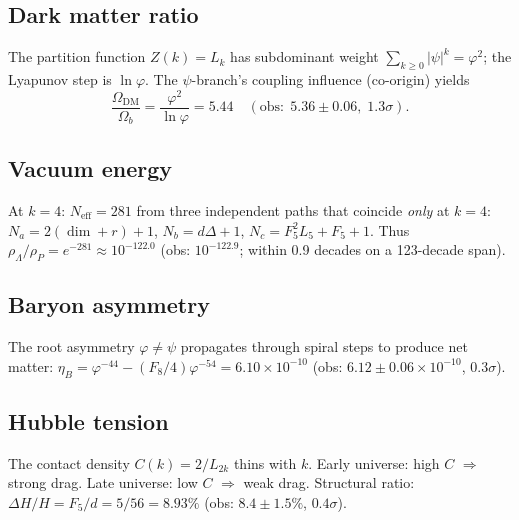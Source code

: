 \documentclass[12pt,a4paper]{article}
\begin{document}
\subsection{Dark matter ratio}
\label{sec:dm-ratio-kiss}
The partition function $Z(k)=L_k$ has subdominant weight $\sum_{k\ge 0}|\psi|^k = \varphi^2$; the Lyapunov step is $\ln\varphi$. The $\psi$-branch's coupling influence (co-origin) yields
\begin{equation}
\frac{\Omega_{\mathrm{DM}}}{\Omega_b} = \frac{\varphi^2}{\ln\varphi} = 5.44 \quad (\mathrm{obs:}\; 5.36 \pm 0.06,\; 1.3\sigma).
\end{equation}

\subsection{Vacuum energy}
At $k=4$: $N_{\mathrm{eff}} = 281$ from three independent paths that coincide \emph{only} at $k=4$: $N_a = 2(\dim+r)+1$, $N_b = d\Delta+1$, $N_c = F_5^2 L_5 + F_5 + 1$. Thus $\rho_\Lambda/\rho_P = e^{-281} \approx 10^{-122.0}$ (obs: $10^{-122.9}$; within 0.9 decades on a 123-decade span).

\subsection{Baryon asymmetry}
The root asymmetry $\varphi \neq \psi$ propagates through spiral steps to produce net matter: $\eta_B = \varphi^{-44} - (F_8/4)\varphi^{-54} = 6.10 \times 10^{-10}$ (obs: $6.12 \pm 0.06 \times 10^{-10}$, $0.3\sigma$).

\subsection{Hubble tension}
The contact density $C(k)=2/L_{2k}$ thins with $k$. Early universe: high $C$ $\Rightarrow$ strong drag. Late universe: low $C$ $\Rightarrow$ weak drag. Structural ratio: $\Delta H/H = F_5/d = 5/56 = 8.93\%$ (obs: $8.4 \pm 1.5\%$, $0.4\sigma$).
\end{document}
